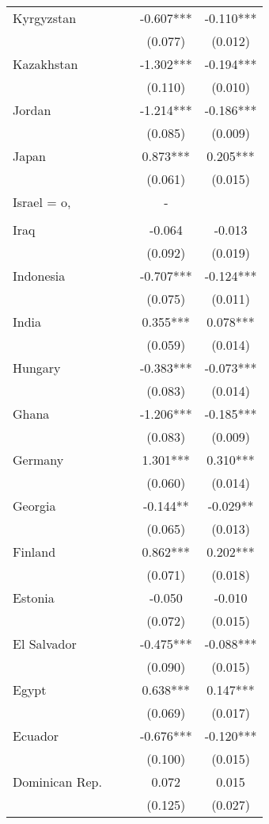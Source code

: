 \documentclass[]{article}
\begin{document}
\begin{tabular}{lcccc}
Kyrgyzstan &  &  & -0.607*** & -0.110*** \\
 &  &  & (0.077) & (0.012) \\
Kazakhstan &  &  & -1.302*** & -0.194*** \\
 &  &  & (0.110) & (0.010) \\
Jordan &  &  & -1.214*** & -0.186*** \\
 &  &  & (0.085) & (0.009) \\
Japan &  &  & 0.873*** & 0.205*** \\
 &  &  & (0.061) & (0.015) \\
Israel = o, &  &  & - &  \\
 &  &  &  &  \\
Iraq &  &  & -0.064 & -0.013 \\
 &  &  & (0.092) & (0.019) \\
Indonesia &  &  & -0.707*** & -0.124*** \\
 &  &  & (0.075) & (0.011) \\
India &  &  & 0.355*** & 0.078*** \\
 &  &  & (0.059) & (0.014) \\
Hungary &  &  & -0.383*** & -0.073*** \\
 &  &  & (0.083) & (0.014) \\
Ghana &  &  & -1.206*** & -0.185*** \\
 &  &  & (0.083) & (0.009) \\
Germany &  &  & 1.301*** & 0.310*** \\
 &  &  & (0.060) & (0.014) \\
Georgia &  &  & -0.144** & -0.029** \\
 &  &  & (0.065) & (0.013) \\
Finland &  &  & 0.862*** & 0.202*** \\
 &  &  & (0.071) & (0.018) \\
Estonia &  &  & -0.050 & -0.010 \\
 &  &  & (0.072) & (0.015) \\
El Salvador &  &  & -0.475*** & -0.088*** \\
 &  &  & (0.090) & (0.015) \\
Egypt &  &  & 0.638*** & 0.147*** \\
 &  &  & (0.069) & (0.017) \\
Ecuador &  &  & -0.676*** & -0.120*** \\
 &  &  & (0.100) & (0.015) \\
Dominican Rep. &  &  & 0.072 & 0.015 \\
 &  &  & (0.125) & (0.027) \\

\end{tabular}
\end{document}

